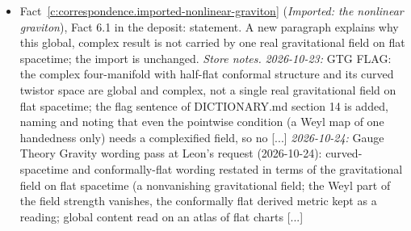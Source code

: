 \documentclass[11pt]{article}
\theoremstyle{definition}
\theoremstyle{plain}
\begin{document}
\begin{itemize}
\item Fact~\ref{c:correspondence.imported-nonlinear-graviton} (\emph{Imported: the nonlinear graviton}), Fact 6.1 in the deposit: statement. A new paragraph explains why this global, complex result is not carried by one real gravitational field on flat spacetime; the import is unchanged. \emph{Store notes.} \emph{2026-10-23:} GTG FLAG: the complex four-manifold with half-flat conformal structure and its curved twistor space are global and complex, not a single real gravitational field on flat spacetime; the flag sentence of DICTIONARY.md section 14 is added, naming and noting that even the pointwise condition (a Weyl map of one handedness only) needs a complexified field, so no [...] \emph{2026-10-24:} Gauge Theory Gravity wording pass at Leon's request (2026-10-24): curved-spacetime and conformally-flat wording restated in terms of the gravitational field on flat spacetime (a nonvanishing gravitational field; the Weyl part of the field strength vanishes, the conformally flat derived metric kept as a reading; global content read on an atlas of flat charts [...]
\end{itemize}
\end{document}
